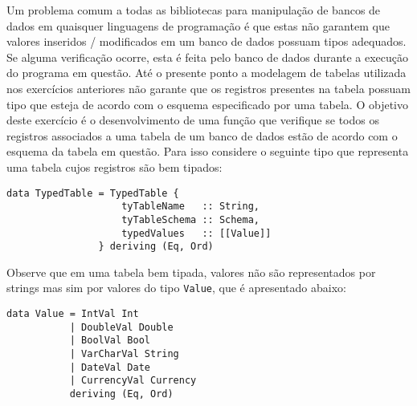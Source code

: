 \documentclass[11pt,a4paper]{report}
\begin{document}
Um problema comum a todas as bibliotecas para manipula\c{c}\~ao de bancos de dados em quaisquer linguagens de 
programa\c{c}\~ao \'e que estas n\~ao garantem que valores inseridos / modificados em um banco de dados possuam
tipos adequados. Se alguma verifica\c{c}\~ao ocorre, esta \'e feita pelo banco de dados durante a execu\c{c}\~ao do
programa em quest\~ao. At\'e o presente ponto a modelagem de tabelas utilizada nos exerc\'icios anteriores n\~ao garante
 que os registros presentes na tabela possuam tipo que esteja de acordo com o esquema especificado por uma tabela. O 
 objetivo deste exerc\'icio \'e o desenvolvimento de uma fun\c{c}\~ao que verifique se todos os registros associados a
 uma tabela de um banco de dados est\~ao de acordo com o esquema da tabela em quest\~ao. Para isso considere o seguinte
 tipo que representa uma tabela cujos registros s\~ao bem tipados:
 \begin{verbatim}
data TypedTable = TypedTable {
                    tyTableName   :: String,
                    tyTableSchema :: Schema,
                    typedValues   :: [[Value]]   
                } deriving (Eq, Ord)
 \end{verbatim}
 
Observe que em uma tabela bem tipada, valores n\~ao s\~ao representados por strings mas sim por valores do tipo 
\texttt{Value}, que \'e apresentado abaixo:

\begin{verbatim}
data Value = IntVal Int
           | DoubleVal Double
           | BoolVal Bool
           | VarCharVal String
           | DateVal Date
           | CurrencyVal Currency 
           deriving (Eq, Ord)
\end{verbatim}
\end{document}

